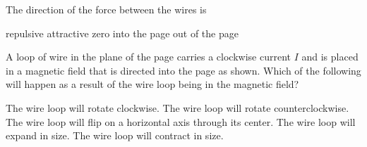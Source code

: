 \documentclass{../../../oss-classkick-exam}
\begin{document}
\begin{multicols*}{2}
\begin{questions}
    \question The direction of the force between the wires is
    \begin{choices}
      \choice repulsive
      \choice attractive
      \choice zero
      \choice into the page
      \choice out of the page
    \end{choices}
    \label{q:2curr2}
    \vspace{.7in}
    
    \question A loop of wire in the plane of the page carries a clockwise
    current $I$ and is placed in a magnetic field that is directed into the
    page as shown. Which of the following will happen as a result of the wire
    loop being in the magnetic field?
    \begin{center}
    \end{center}
    \begin{choices}
      \choice The wire loop will rotate clockwise.
      \choice The wire loop will rotate counterclockwise.
      \choice The wire loop will flip on a horizontal axis through its center.
      \choice The wire loop will expand in size.
      \choice The wire loop will contract in size.
    \end{choices}
    \vspace{.7in}



\end{questions}
\end{multicols*}
\end{document}
